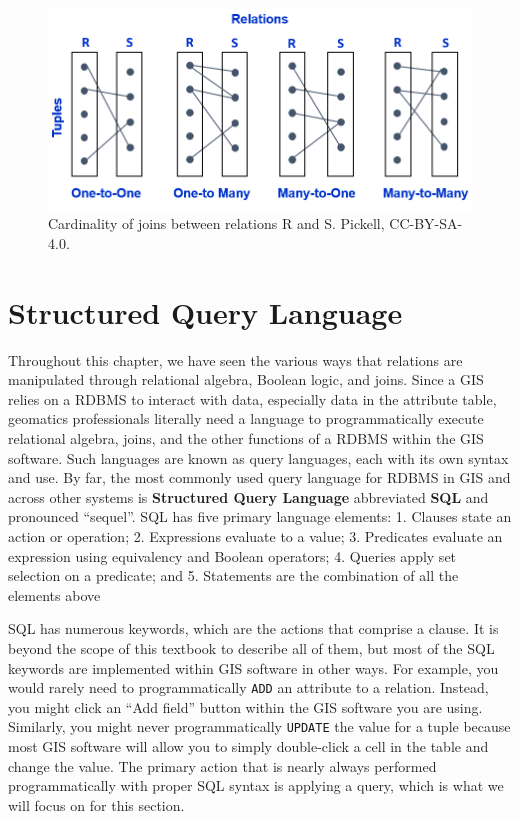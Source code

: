 \documentclass[
]{book}
\begin{document}
\begin{figure}
\includegraphics[width=0.75\linewidth]{images/05-join-cardinality} \caption{Cardinality of joins between relations R and S. Pickell, CC-BY-SA-4.0.}\label{fig:5-join-cardinality}
\end{figure}

\section{Structured Query Language}\label{structured-query-language}

Throughout this chapter, we have seen the various ways that relations are manipulated through relational algebra, Boolean logic, and joins. Since a GIS relies on a RDBMS to interact with data, especially data in the attribute table, geomatics professionals literally need a language to programmatically execute relational algebra, joins, and the other functions of a RDBMS within the GIS software. Such languages are known as query languages, each with its own syntax and use. By far, the most commonly used query language for RDBMS in GIS and across other systems is \textbf{Structured Query Language} abbreviated \textbf{SQL} and pronounced ``sequel''. SQL has five primary language elements:
1. Clauses state an action or operation;
2. Expressions evaluate to a value;
3. Predicates evaluate an expression using equivalency and Boolean operators;
4. Queries apply set selection on a predicate; and
5. Statements are the combination of all the elements above

SQL has numerous keywords, which are the actions that comprise a clause. It is beyond the scope of this textbook to describe all of them, but most of the SQL keywords are implemented within GIS software in other ways. For example, you would rarely need to programmatically \texttt{ADD} an attribute to a relation. Instead, you might click an ``Add field'' button within the GIS software you are using. Similarly, you might never programmatically \texttt{UPDATE} the value for a tuple because most GIS software will allow you to simply double-click a cell in the table and change the value. The primary action that is nearly always performed programmatically with proper SQL syntax is applying a query, which is what we will focus on for this section.
\end{document}
